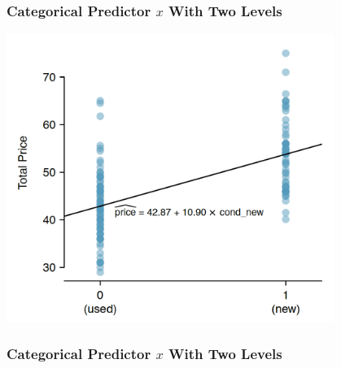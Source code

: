 \documentclass[slides]{beamer}
\begin{document}
\begin{frame}[fragile]
\frametitle{Categorical Predictor $x$ With Two Levels}

\begin{center}
\includegraphics[width=0.8\textwidth]{figure/mario_kart.png}
\end{center}

\end{frame}


\begin{frame}[fragile]
\frametitle{Categorical Predictor $x$ With Two Levels}
%
%

\end{frame}
\end{document}
